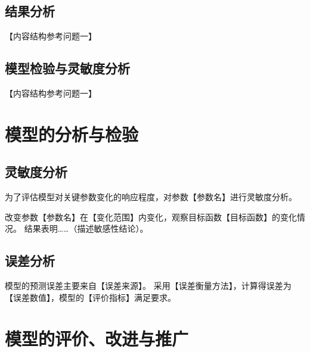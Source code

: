 \documentclass[withoutpreface,bwprint]{cumcmthesis}
\begin{document}
\subsection{结果分析}
【内容结构参考问题一】

\subsection{模型检验与灵敏度分析}
【内容结构参考问题一】

\newpage

\section{模型的分析与检验}

\subsection{灵敏度分析}

为了评估模型对关键参数变化的响应程度，对参数【参数名】进行灵敏度分析。

改变参数【参数名】在【变化范围】内变化，观察目标函数【目标函数】的变化情况。
结果表明……（描述敏感性结论）。

\subsection{误差分析}

模型的预测误差主要来自【误差来源】。
采用【误差衡量方法】，计算得误差为【误差数值】，模型的【评价指标】满足要求。

\newpage

\section{模型的评价、改进与推广}
\end{document}
